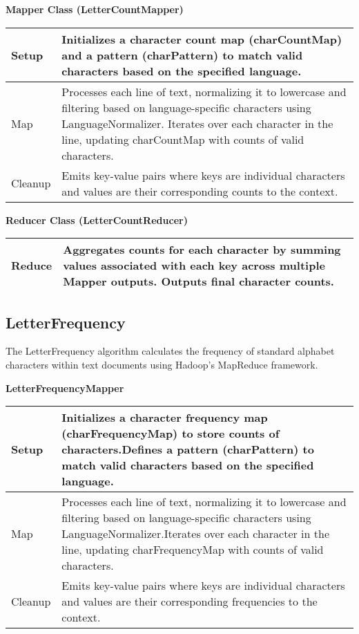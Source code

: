 \textbf{Mapper Class (LetterCountMapper)}
\begin{longtable}{|>{\raggedright\arraybackslash}p{}|>{\raggedright\arraybackslash}p{}|}
    \hline
    Setup & Initializes a character count map (charCountMap) and a pattern (charPattern) to match valid characters based on the specified language. \\
    \hline
    Map & Processes each line of text, normalizing it to lowercase and filtering based on language-specific characters using LanguageNormalizer. Iterates over each character in the line, updating charCountMap with counts of valid characters. \\
    \hline
    Cleanup & Emits key-value pairs where keys are individual characters and values are their corresponding counts to the context. \\
    \hline
\end{longtable}


\textbf{Reducer Class (LetterCountReducer)}
\begin{longtable}{|>{\raggedright\arraybackslash}p{}|>{\raggedright\arraybackslash}p{}|}
    \hline
    Reduce & Aggregates counts for each character by summing values associated with each key across multiple Mapper outputs. Outputs final character counts. \\
    \hline
\end{longtable}






\subsection{LetterFrequency}
The LetterFrequency algorithm calculates the frequency of standard alphabet characters within text documents using Hadoop's MapReduce framework.


\textbf{LetterFrequencyMapper}
\begin{longtable}{|>{\raggedright\arraybackslash}p{}|>{\raggedright\arraybackslash}p{}|}
    \hline
    Setup & Initializes a character frequency map (charFrequencyMap) to store counts of characters.Defines a pattern (charPattern) to match valid characters based on the specified language. \\
    \hline
    Map & Processes each line of text, normalizing it to lowercase and filtering based on language-specific characters using LanguageNormalizer.Iterates over each character in the line, updating charFrequencyMap with counts of valid characters.\\
    \hline
    Cleanup & Emits key-value pairs where keys are individual characters and values are their corresponding frequencies to the context.
    \\
    \hline
\end{longtable}


